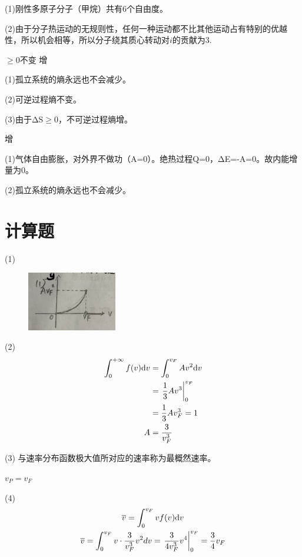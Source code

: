 
\solve (1)刚性多原子分子（甲烷）共有6个自由度。

(2)由于分子热运动的无规则性，任何一种运动都不比其他运动占有特别的优越性，所以机会相等，所以分子绕其质心转动对$i$的贡献为3.

\exercise $\geqslant 0 $\qquad 不变 \qquad 增

\solve
(1)孤立系统的熵永远也不会减少。

(2)可逆过程熵不变。

(3)由于ΔS$\geqslant 0$，不可逆过程熵增。


 \qquad 增

\solve(1)气体自由膨胀，对外界不做功（A=0）。绝热过程Q=0，ΔE=-A=0。故内能增量为0。

(2)孤立系统的熵永远也不会减少。


\section{计算题}
\exercise

\solve
(1)
\begin{figure}[!ht]
	\centering
	\includegraphics[width=0.35\textwidth]{./pics/Chp12_21.jpg}
\end{figure}

(2)
\begin{align*}
\int _ { 0 } ^ {+\infty}f(v)\mathrm{d}v
&=\int _ { 0 } ^ {v_F}Av^2\mathrm{d}v\\
&=\left. \dfrac { 1 } { 3 } A v ^ { 3 } \right| _ { 0 } ^ { v _ { F } }\\
&=\dfrac { 1 } { 3 } A v_F^3= 1 \\ 
A&=\dfrac{3}{ v_F^3 }
\end{align*}

(3)
与速率分布函数极大值所对应的速率称为最概然速率。

\therefore $v_P=v_F$

(4)
\begin{gather*}
{\overline{ v } = \int _ { 0 } ^ { v _ { F } } v f ( v )\mathrm{d}v} \\
 {\overline{ v } = \int _ { 0 } ^ { v _ { F } } v \cdot \frac { 3 } { v _ { F } ^ { 3 } } v ^ { 2 } d v = \left. \frac { 3 } { 4 v _ { F } ^ { 3 } } v ^ { 4 } \right| _ { 0 } ^ { v _ { F } } = \frac { 3 } { 4 } v _ { F } } 
\end{gather*}

